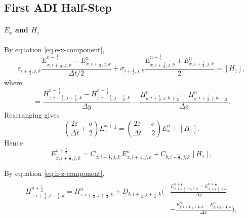 \documentclass{article}
\numberwithin{equation}{section}
\numberwithin{figure}{section}
\begin{document}
\subsection{First ADI Half-Step}

\paragraph{$E_x$ and $H_z$}
By equation \eqref{eq:e-x-component},
\begin{equation}
    \varepsilon_{i+\tfrac12,j,k} \frac{E_{x,i+\tfrac12,j,k}^{n+\frac12}-E_{x,i+\tfrac12,j,k}^{n}}{\Delta t/2} + \sigma_{i+\tfrac12,j,k} \frac{E_{x,i+\tfrac12,j,k}^{n+\frac12}+E_{x,i+\tfrac12,j,k}^{n}}{2} = [H_1],
    \label{eq:first-e-ex}
\end{equation}
where
\begin{equation}
    [H_1] = \frac{H_{z,i+\tfrac12,j+\tfrac12,k}^{n+\frac12}-H_{z,i+\tfrac12,j-\tfrac12,k}^{n+\frac12}}{\Delta y} - \frac{H_{y,i+\tfrac12,j,k+\tfrac12}^{n}-H_{y,i+\tfrac12,j,k-\tfrac12}^{n}}{\Delta z}.
\end{equation}
Rearranging gives
\begin{equation}
    \left(\frac{2\varepsilon}{\Delta t}+\frac{\sigma}{2}\right) E_{x}^{n+\frac12} = \left(\frac{2\varepsilon}{\Delta t}-\frac{\sigma}{2}\right) E_{x}^{n} + [H_1].
\end{equation}
Hence
\begin{equation}
    E_{x,i+\tfrac12,j,k}^{n+\frac12} = C_{a,i+\tfrac12,j,k}\,E_{x,i+\tfrac12,j,k}^{n} + C_{b,i+\tfrac12,j,k}\,[H_1],
    \label{eq:first-e-ex-adi}
\end{equation}

By equation \eqref{eq:h-z-component},
\begin{align}
    \begin{split}
        H_{z,i+\tfrac12,j+\tfrac12,k}^{n+\frac12} = H_{z,i+\tfrac12,j+\tfrac12,k}^{n} + D_{b,i+\tfrac12,j+\tfrac12,k}\Big( & \frac{E_{x,i+\tfrac12,j+1,k}^{n+\frac12}-E_{x,i+\tfrac12,j,k}^{n+\frac12}}{\Delta y} \\
                                                                                                                           & - \frac{E_{y,i+1,j+\tfrac12,k}^{n}-E_{y,i,j+\tfrac12,k}^{n}}{\Delta x}\Big),
    \end{split}
\end{align}
\end{document}

